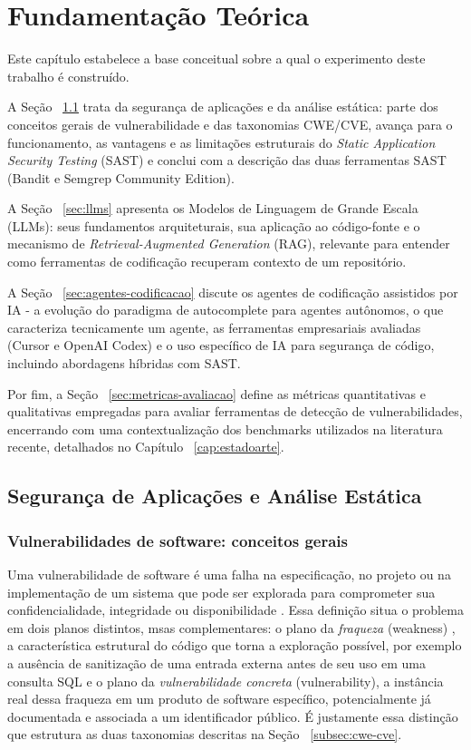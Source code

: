 \chapter{Fundamentação Teórica}\label{cap:fundTeoric}
Este capítulo estabelece a base conceitual sobre a qual o experimento deste trabalho é construído. 

A Seção ~\ref{sec:seguranca-aplicacoes} trata da segurança de aplicações e da análise estática: parte dos conceitos gerais de vulnerabilidade e das taxonomias CWE/CVE, avança para o funcionamento, as vantagens e as limitações estruturais do \textit{Static Application Security Testing} (SAST) e conclui com a descrição das duas ferramentas SAST  (Bandit e Semgrep Community Edition). 

A Seção ~\ref{sec:llms} apresenta os Modelos de Linguagem de Grande Escala (LLMs): seus fundamentos arquiteturais, sua aplicação ao código-fonte e o mecanismo de \textit{Retrieval-Augmented Generation} (RAG), relevante para entender como ferramentas de codificação recuperam contexto de um repositório. 

A Seção ~\ref{sec:agentes-codificacao} discute os agentes de codificação assistidos por IA - a evolução do paradigma de autocomplete para agentes autônomos, o que caracteriza tecnicamente um agente, as ferramentas empresariais avaliadas (Cursor e OpenAI Codex) e o uso específico de IA para segurança de código, incluindo abordagens híbridas com SAST. 

Por fim, a Seção ~\ref{sec:metricas-avaliacao} define as métricas quantitativas e qualitativas empregadas para avaliar ferramentas de detecção de vulnerabilidades, encerrando com uma contextualização dos benchmarks utilizados na literatura recente, detalhados no Capítulo ~\ref{cap:estadoarte}.


\section{Segurança de Aplicações e Análise Estática}\label{sec:seguranca-aplicacoes}
\subsection{Vulnerabilidades de software: conceitos gerais}\label{subsec:vulnerabilidades-software}
Uma vulnerabilidade de software é uma falha na especificação, no projeto ou na implementação de um sistema que pode ser explorada para comprometer sua confidencialidade, integridade ou disponibilidade \cite{MITRECWE2024}. Essa definição situa o problema em dois planos distintos, msas complementares: o plano da \textit{fraqueza} (weakness) , a característica estrutural do código que torna a exploração possível, por exemplo a ausência de sanitização de uma entrada externa antes de seu uso em uma consulta SQL  e o plano da \textit{vulnerabilidade concreta} (vulnerability), a instância real dessa fraqueza em um produto de software específico, potencialmente já documentada e associada a um identificador público. É justamente essa distinção que estrutura as duas taxonomias descritas na Seção  ~\ref{subsec:cwe-cve}.

